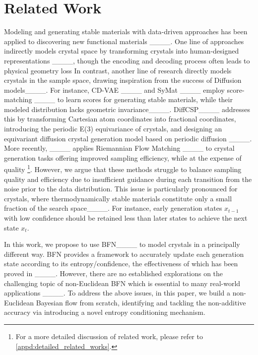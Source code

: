 \section{Related Work}
Modeling and generating stable materials with data-driven approaches has been applied to discovering new functional materials ____. One line of approaches indirectly models crystal space by transforming crystals into human-designed representations ____, though the encoding and decoding process often leads to physical geometry loss 
In contrast, another line of research directly models crystals in the sample space, drawing inspiration from the success of Diffusion models____. For instance, CD-VAE ____ and SyMat ____ employ score-matching ____ to learn scores for generating stable materials, while their modeled distribution lacks geometric invariance____. DiffCSP____ addresses this by transforming Cartesian atom coordinates into fractional coordinates, introducing the periodic E(3) equivariance of crystals, and designing an equivariant diffusion crystal generation model based on periodic diffusion ____. More recently, ____ applies Riemannian Flow Matching ____ to crystal generation tasks offering improved sampling efficiency, while at the expense of quality \footnote{For a more detailed discussion of related work, please refer to \cref{appd:detailed_related_works}.}. However, we argue that these methods struggle to balance sampling quality and efficiency due to insufficient guidance during each transition from the noise prior to the data distribution. This issue is particularly pronounced for crystals, where thermodynamically stable materials constitute only a small fraction of the search space____. For instance, early generation states $x_{t-1}$ with low confidence should be retained less than later states to achieve the next state $x_{t}$. 


In this work, we propose to use BFN____ to model crystals in a principally different way. BFN provides a framework to accurately update each generation state according to its entropy/confidence, the effectiveness of which has been proved in ____. 
However, there are no established explorations on the challenging topic of non-Euclidean BFN which is essential to many real-world applications ____. 
To address the above issues, in this paper, we build a non-Euclidean Bayesian flow from scratch, identifying and tackling the non-additive accuracy via introducing a novel entropy conditioning mechanism.
 




